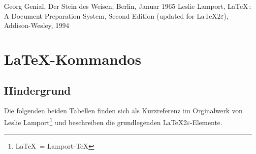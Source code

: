\documentclass[10pt]{report}
\begin{document}

\begin{thebibliography}{}
 Georg Genial, Der Stein des Weisen, Berlin, Januar 1965
 Leslie Lamport, \LaTeX\,: A Document Preparation System, Second Edition (updated for \LaTeX{}$2\varepsilon$), Addison-Wesley, 1994
\end{thebibliography}

\appendix
\chapter{\LaTeX-Kommandos}

\section{Hindergrund}
Die folgenden beiden Tabellen finden sich als Kurzreferenz im Orginalwerk von Leslie Lamport\footnote{\LaTeX\ = Lamport-\TeX} \cite{LL94} und beschreiben die grundlegenden \LaTeX{}2$\varepsilon$-Elemente.

\end{document}
